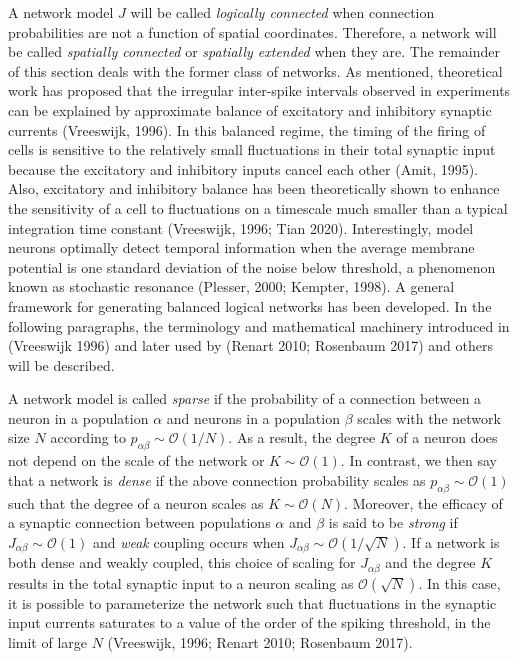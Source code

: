 \documentclass{ucetd}
\begin{document}
A network model $J$ will be called \emph{logically connected} when connection probabilities are not a function of spatial coordinates. Therefore, a network will be called \emph{spatially connected} or \emph{spatially extended} when they are. The remainder of this section deals with the former class of networks. As mentioned, theoretical work has proposed that the irregular inter-spike intervals observed in experiments can be explained by approximate balance of excitatory and inhibitory synaptic currents (Vreeswijk, 1996). In this balanced regime, the timing of the firing of cells is sensitive to the relatively small fluctuations in their total synaptic input because the excitatory and inhibitory inputs cancel each other (Amit, 1995). Also, excitatory and inhibitory balance has been theoretically shown to enhance the sensitivity of a cell to fluctuations on a timescale much smaller than a typical integration time constant (Vreeswijk, 1996; Tian 2020). Interestingly, model neurons optimally detect temporal information when the average membrane potential is one standard deviation of the noise below threshold, a phenomenon known as stochastic resonance (Plesser, 2000; Kempter, 1998). A general framework for generating balanced logical networks has been developed. In the following paragraphs, the terminology and mathematical machinery introduced in (Vreeswijk 1996) and later used by (Renart 2010; Rosenbaum 2017) and others will be described.

A network model is called \emph{sparse} if the probability of a connection between a neuron in a population $\alpha$ and neurons in a population $\beta$ scales with the network size $N$ according to $p_{\alpha\beta} \sim \mathcal{O}(1/N)$. As a result, the degree $K$ of a neuron does not depend on the scale of the network or $K \sim \mathcal{O}(1)$. In contrast, we then say that a network is \emph{dense} if the above connection probability scales as $p_{\alpha\beta} \sim \mathcal{O}(1)$ such that the degree of a neuron scales as $K \sim \mathcal{O}(N)$. Moreover, the efficacy of a synaptic connection between populations $\alpha$ and $\beta$ is said to be \emph{strong} if $J_{\alpha\beta} \sim \mathcal{O}(1)$ and \emph{weak} coupling occurs when $J_{\alpha\beta} \sim \mathcal{O}(1/\sqrt{N})$. If a network is both dense and weakly coupled, this choice of scaling for $J_{\alpha\beta}$ and the degree $K$ results in the total synaptic input to a neuron scaling as $\mathcal{O}(\sqrt{N})$. In this case, it is possible to parameterize the network such that fluctuations in the synaptic input currents saturates to a value of the order of the spiking threshold, in the limit of large $N$ (Vreeswijk, 1996; Renart 2010; Rosenbaum 2017).  
\end{document}
